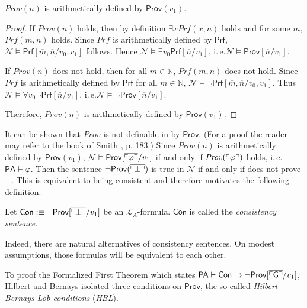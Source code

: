 \begin{thm}\label{thm:PAprov}
$\mathit{Prov}(n)$ is arithmetically defined by $\mathsf{Prov}(v_1)$.
\end{thm}
\begin{proof}
If $\mathit{Prov}(n)$ holds, then by definition $\exists x  \mathit{Prf}(x,n)$ holds and for some $m$, $\mathit{Prf}(m,n)$ holds. Since $\mathit{Prf}$ is arithmetically defined by $\mathsf{Prf}$, $\mathcal{N}\vDash\mathsf{Prf}[\overline{m}, \overline{n}/v_0,v_1]$ follows. Hence $\mathcal{N} \vDash \exists  v_0  \mathsf{Prf}[\overline{n}/v_1]$, i.\,e.\@ $\mathcal{N} \vDash  \mathsf{Prov}[\overline{n}/v_1]$. 

If $\mathit{Prov}(n)$ does not hold, then for all $m \in \mathbb{N}$, $\mathit{Prf}(m,n)$ does not hold. Since $\mathit{Prf}$ is arithmetically defined by $\mathsf{Prf}$ for all $m\in \mathbb{N}$, $\mathcal{N} \vDash\lnot \mathsf{Prf}[\overline{m}, \overline{n}/v_0, v_1]$. Thus $\mathcal{N} \vDash \forall v_0 \lnot \mathsf{Prf}[ \overline{n}/v_1]$, i.\,e.\@ $ \mathcal{N} \vDash \lnot \mathsf{Prov}[\overline{n}/v_1]$. 

Therefore, $\mathit{Prov}(n)$ is arithmetically defined by $\mathsf{Prov}(v_1)$.
\end{proof}

It can be shown that $\mathit{Prov}$ is not definable in \PA by $\mathsf{Prov}$. (For a proof the reader may refer to the book of Smith \cite{Smith2009}, p. 183.) Since $\mathit{Prov}(n)$ is arithmetically defined by $\mathsf{Prov}(v_1)$, $\mathcal{N}\vDash \mathsf{Prov}[\overline{\ulcorner \varphi \urcorner}/v_1]$ if and only if $\mathit{Prov}(\ulcorner \varphi \urcorner)$ holds, i.\,e.\@ $\mathsf{PA} \vdash \varphi$. Then the sentence $\mathsf{\lnot Prov(\overline{\ulcorner \bot \urcorner})}$ is true in $\mathcal{N}$ if and only if \PA does not prove $\bot$. This is equivalent to \PA being consistent and therefore motivates the following definition.

\begin{dfn}
Let $\mathsf{Con} \vcentcolon \equiv \mathsf{\lnot Prov}[\overline{\ulcorner \bot \urcorner}/v_1]$ be an $\mathcal{L}_A$-formula. $\mathsf{Con}$ is called the \textit{consistency sentence}.
\end{dfn}

Indeed, there are natural alternatives of consistency sentences. On modest assumptions, those formulas will be equivalent to each other.

To proof the Formalized First Theorem which states $\mathsf{PA} \vdash \mathsf{Con} \rightarrow \lnot \mathsf{Prov}[\overline{\ulcorner\mathsf{G} \urcorner}/v_1]$, Hilbert and Bernays isolated three conditions on $\mathsf{Prov}$, the so-called \textit{Hilbert-Bernays-L\"ob conditions} (\textit{HBL}). 

